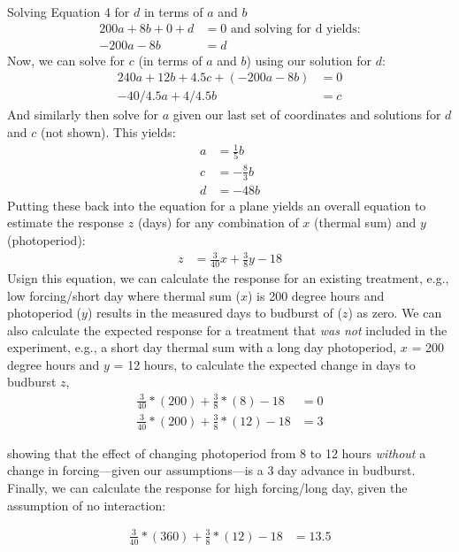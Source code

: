 \documentclass[11pt]{article}
\begin{document}
Solving Equation 4 for $d$ in terms of $a$ and $b$
  \begin{align}
200a + 8b + 0 + d & = 0 \text{ and solving for d yields:} \\
-200a - 8b & =  d  %
\end{align}
Now, we can solve for $c$ (in terms of $a$ and $b$) using our solution for $d$:
  \begin{align}
240a+12b+4.5c+(-200a - 8b) & = 0\\
-40/4.5a+4/4.5b & = c%
\end{align}
And similarly then solve for $a$ given our last set of coordinates and solutions for $d$ and $c$ (not shown). This yields:
  \begin{align}
a & =\frac{1}{5}b\\
c & =-\frac{8}{3}b\\
d & =-48b
\end{align}
Putting these back into the equation for a plane yields an overall equation to estimate the response $z$ (days) for any combination of $x$ (thermal sum) and $y$ (photoperiod):
  \begin{align}
z & = \frac{3}{40}x + \frac{3}{8}y-18
\end{align}
Usign this equation, we can calculate the response for an existing treatment, e.g., low forcing/short day where thermal sum ($x$) is 200 degree hours and photoperiod ($y$) results in the measured days to budburst of ($z$) as zero.  We can also calculate the expected response for a treatment that \textit{was not} included in the experiment, e.g., a short day thermal sum with a long day photoperiod, $x$ = 200 degree hours and $y$ = 12 hours, to calculate the expected change in days to budburst $z$,
\begin{align}
\frac{3}{40}*(200) + \frac{3}{8}*(8)-18 &=0\\ 
\frac{3}{40}*(200) + \frac{3}{8}*(12)-18 &=3 
\end{align}

showing that the effect of changing photoperiod from 8 to 12 hours \textit{without} a change in forcing---given our assumptions---is a 3 day advance in budburst.\\ 

Finally, we can calculate the response for high forcing/long day, given the assumption of no interaction:
  
  \begin{align}
\frac{3}{40}*(360) + \frac{3}{8}*(12)-18 &=13.5
\end{align}
\end{document}
